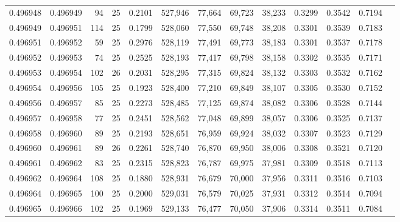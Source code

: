 \begin{tabular}{rrrrrrrrrrrrr}
0.496948 & 0.496949 &    94 &  25 &                                     0.2101 & 527,946 &  77,664 &  69,723 &  38,233 & 0.3299 & 0.3542 & 0.7194 \\
0.496949 & 0.496951 &   114 &  25 &                                     0.1799 & 528,060 &  77,550 &  69,748 &  38,208 & 0.3301 & 0.3539 & 0.7183 \\
0.496951 & 0.496952 &    59 &  25 &                                     0.2976 & 528,119 &  77,491 &  69,773 &  38,183 & 0.3301 & 0.3537 & 0.7178 \\
0.496952 & 0.496953 &    74 &  25 &                                     0.2525 & 528,193 &  77,417 &  69,798 &  38,158 & 0.3302 & 0.3535 & 0.7171 \\
0.496953 & 0.496954 &   102 &  26 &                                     0.2031 & 528,295 &  77,315 &  69,824 &  38,132 & 0.3303 & 0.3532 & 0.7162 \\
0.496954 & 0.496956 &   105 &  25 &                                     0.1923 & 528,400 &  77,210 &  69,849 &  38,107 & 0.3305 & 0.3530 & 0.7152 \\
0.496956 & 0.496957 &    85 &  25 &                                     0.2273 & 528,485 &  77,125 &  69,874 &  38,082 & 0.3306 & 0.3528 & 0.7144 \\
0.496957 & 0.496958 &    77 &  25 &                                     0.2451 & 528,562 &  77,048 &  69,899 &  38,057 & 0.3306 & 0.3525 & 0.7137 \\
0.496958 & 0.496960 &    89 &  25 &                                     0.2193 & 528,651 &  76,959 &  69,924 &  38,032 & 0.3307 & 0.3523 & 0.7129 \\
0.496960 & 0.496961 &    89 &  26 &                                     0.2261 & 528,740 &  76,870 &  69,950 &  38,006 & 0.3308 & 0.3521 & 0.7120 \\
0.496961 & 0.496962 &    83 &  25 &                                     0.2315 & 528,823 &  76,787 &  69,975 &  37,981 & 0.3309 & 0.3518 & 0.7113 \\
0.496962 & 0.496964 &   108 &  25 &                                     0.1880 & 528,931 &  76,679 &  70,000 &  37,956 & 0.3311 & 0.3516 & 0.7103 \\
0.496964 & 0.496965 &   100 &  25 &                                     0.2000 & 529,031 &  76,579 &  70,025 &  37,931 & 0.3312 & 0.3514 & 0.7094 \\
0.496965 & 0.496966 &   102 &  25 &                                     0.1969 & 529,133 &  76,477 &  70,050 &  37,906 & 0.3314 & 0.3511 & 0.7084 \\

\end{tabular}
